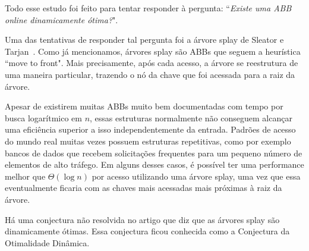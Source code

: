 Todo esse estudo foi feito para tentar responder à pergunta: ``\textit{Existe uma ABB online dinamicamente ótima?}".

Uma das tentativas de responder tal pergunta foi a árvore splay de Sleator e Tarjan~\cite{selfadjustingbst}. Como já mencionamos, árvores splay são ABBs que seguem a heurística ``move to front". Mais precisamente, após cada acesso, a árvore se reestrutura de uma maneira particular, trazendo o nó da chave que foi acessada para a raiz da árvore.

Apesar de existirem muitas ABBs muito bem documentadas com tempo por busca logarítmico em $n$, essas estruturas normalmente não conseguem alcançar uma eficiência superior a isso independentemente da entrada. Padrões de acesso do mundo real muitas vezes possuem estruturas repetitivas, como por exemplo bancos de dados que recebem solicitações frequentes para um pequeno número de elementos de alto tráfego. Em alguns desses casos, é possível ter uma performance melhor que $\Theta(\log n)$ por acesso utilizando uma árvore splay, uma vez que essa eventualmente ficaria com as chaves mais acessadas mais próximas à raiz da árvore. 

Há uma conjectura não resolvida no artigo \cite{selfadjustingbst} que diz que as árvores splay são dinamicamente ótimas. Essa conjectura ficou conhecida como a Conjectura da Otimalidade Dinâmica.





